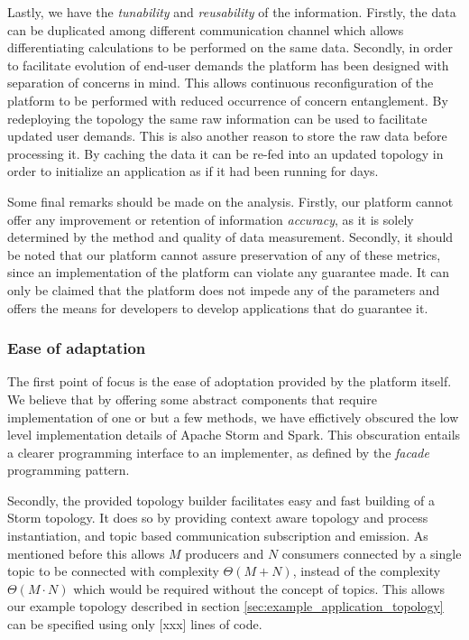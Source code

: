 Lastly, we have the \emph{tunability} and \emph{reusability} of the information. Firstly, the data can be duplicated among different communication channel which allows differentiating calculations to be performed on the same data. Secondly, in order to facilitate evolution of end-user demands the platform has been designed with separation of concerns in mind. This allows continuous reconfiguration of the platform to be performed with reduced occurrence of concern entanglement. By redeploying the topology the same raw information can be used to facilitate updated user demands. This is also another reason to store the raw data before processing it. By caching the data it can be re-fed into an updated topology in order to initialize an application as if it had been running for days.

Some final remarks should be made on the analysis. Firstly, our platform cannot offer any improvement or retention of information \emph{accuracy}, as it is solely determined by the method and quality of data measurement. Secondly, it should be noted that our platform cannot assure preservation of any of these metrics, since an implementation of the platform can violate any guarantee made. It can only be claimed that the platform does not impede any of the parameters and offers the means for developers to develop applications that do guarantee it.

\subsubsection*{Ease of adaptation}
The first point of focus is the ease of adoptation provided by the platform itself. We believe that by offering some abstract components that require implementation of one or but a few methods, we have effictively obscured the low level implementation details of Apache Storm and Spark. This obscuration entails a clearer programming interface to an implementer, as defined by the \emph{facade} programming pattern. \cite{facade_pattern} 

Secondly, the provided topology builder facilitates easy and fast building of a Storm topology. It does so by providing context aware topology and process instantiation, and topic based communication subscription and emission.  As mentioned before this allows $M$ producers and $N$ consumers connected by a single topic to be connected with complexity $\Theta(M+N)$, instead of the complexity $\Theta(M\cdot N)$ which would be required without the concept of topics. This allows our example topology described in section \ref{sec:example_application_topology} can be specified using only [xxx] lines of code.

